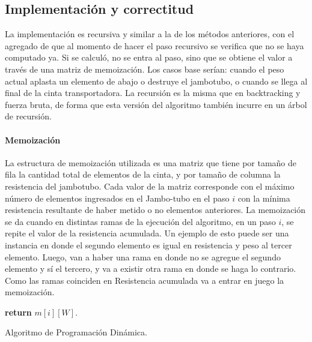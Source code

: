\documentclass[10pt,a4paper]{article}
\begin{document}
\subsection{Implementación y correctitud}
La implementación es recursiva y similar a la de los métodos anteriores, con el agregado de que al momento de hacer el paso recursivo se verifica que no se haya computado ya. Si se calculó, no se entra al paso, sino que se obtiene el valor a través de una matriz de memoización. Los casos base serían: cuando el peso actual aplasta un elemento de abajo o destruye el jambotubo, o cuando se llega al final de la cinta transportadora. \newline 
La recursión es la misma que en backtracking y fuerza bruta, de forma que esta versión del algoritmo también incurre en un árbol de recursión.
\paragraph{Memoización}
La estructura de memoización utilizada es una matriz que tiene por tamaño de fila la cantidad total de elementos de la cinta, y por tamaño de columna la resistencia del jambotubo. Cada valor de la matriz corresponde con el máximo número de elementos ingresados en el Jambo-tubo en el paso $i$ con la mínima resistencia resultante de haber metido o no elementos anteriores.
La memoización se da cuando en distintas ramas de la ejecución del algoritmo, en un paso $i$, se repite el valor de la resistencia acumulada. Un ejemplo de esto puede ser una instancia en donde el segundo elemento es igual en resistencia y peso al tercer elemento. Luego, van a haber una rama en donde no se agregue el segundo elemento y sí el tercero, y va a existir otra rama en donde se haga lo contrario. Como las ramas coinciden en Resistencia acumulada va a entrar en juego la memoización.
\begin{algorithm}
	\begin{algorithmic}[1]
		
		\EndIf

		\EndIf
		
		\EndIf
		
		\State \textbf{return} $m[i][W]$.
		
		\EndFunction
	\end{algorithmic}
	\caption{Algoritmo de Programación Dinámica.}
	\label{alg:dinamica}
\end{algorithm}
\end{document}
